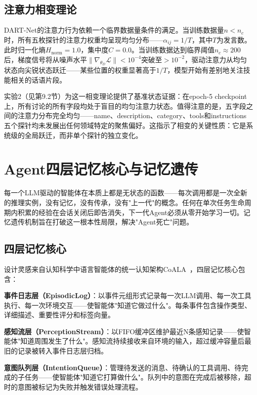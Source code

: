 \documentclass[12pt,a4paper]{ctexart}
\begin{document}
\subsection{注意力相变理论}

DART-Net的注意力行为依赖一个临界数据量条件的满足。当训练数据量$n < n_c$时，所有五枚探针的注意力权重均呈现均匀分布——$\alpha_{ij} = 1/T$，其中$T$为发言数。此时归一化熵$H_{\text{norm}} = 1.0$，集中度$C = 0.0$。当训练数据达到临界阈值$n_c \approx 200$后，梯度信号将从噪声水平$\|\nabla_{\theta_D} \mathcal{L}\| < 10^{-4}$突破至$> 10^{-2}$，驱动注意力从均匀状态向尖锐状态跃迁——某些位置的权重显著高于$1/T$，模型开始有差别地关注技能相关的话语片段。

实验2（见第9.2节）为这一相变理论提供了基准状态证据：在epoch-5 checkpoint上，所有讨论的所有字段均处于盲目的均匀注意力状态。值得注意的是，五字段之间的注意力分布完全均匀——name、description、category、tools和instructions五个探针均未发展出任何领域特定的聚焦偏好。这指示了相变的关键性质：它是系统级的全局跃迁，而非单个探针的独立变化。

\section{Agent四层记忆核心与记忆遗传}

每一个LLM驱动的智能体在本质上都是无状态的函数——每次调用都是一次全新的推理实例，没有记忆，没有传承，没有"上一代"的概念。任何在单次任务生命周期内积累的经验在会话关闭后即告消失，下一代Agent必须从零开始学习一切。记忆遗传机制旨在打破这一根本性局限，解决"Agent死亡"问题。

\subsection{四层记忆核心}

设计灵感来自认知科学中语言智能体的统一认知架构CoALA~\cite{sumers2023coala}，四层记忆核心包含：

\textbf{事件日志层（EpisodicLog）}：以事件元组形式记录每一次LLM调用、每一次工具执行、每一次环境交互——使智能体"知道它做过什么"。每条事件包含操作类型、详细描述、重要性评分和标签向量。

\textbf{感知流层（PerceptionStream）}：以FIFO缓冲区维护最近N条感知记录——使智能体"知道周围发生了什么"。感知流持续接收来自环境的输入，超过缓冲容量后最旧的记录被转入事件日志层归档。

\textbf{意图队列层（IntentionQueue）}：管理待发送的消息、待确认的工具调用、待完成的子任务——使智能体"知道它打算做什么"。队列中的意图在完成后被移除，超时的意图被标记为失败并触发错误处理流程。
\end{document}

